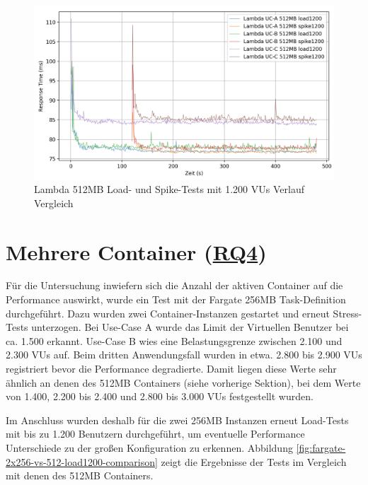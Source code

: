 \begin{figure}[H]
    \includegraphics[width=\textwidth]{img/lambda512-load1200-vs-spike1200-graph.png}
    \caption[Lambda 512MB Load- und Spike-Tests mit 1.200 VUs Verlauf Vergleich]{Lambda 512MB Load- und Spike-Tests mit 1.200 VUs Verlauf Vergleich}
    \label{fig:lambda512-load1200-vs-spike1200-graph}
\end{figure}

\section{Mehrere Container (\hyperref[tab:research-questions]{RQ4})}
Für die Untersuchung inwiefern sich die Anzahl der aktiven Container auf die Performance auswirkt, wurde ein Test mit der Fargate 256MB Task-Definition durchgeführt. Dazu wurden zwei Container-Instanzen gestartet und erneut Stress-Tests unterzogen. Bei Use-Case A wurde das Limit der Virtuellen Benutzer bei ca. 1.500 erkannt. Use-Case B wies eine Belastungsgrenze zwischen 2.100 und 2.300 \acp{VU} auf. Beim dritten Anwendungsfall wurden in etwa. 2.800 bis 2.900 \acp{VU} registriert bevor die Performance degradierte. 
Damit liegen diese Werte sehr ähnlich an denen des 512MB Containers (siehe vorherige Sektion), bei dem Werte von 1.400, 2.200 bis 2.400 und 2.800 bis 3.000 \acp{VU} festgestellt wurden.

Im Anschluss wurden deshalb für die zwei 256MB Instanzen erneut Load-Tests mit bis zu 1.200 Benutzern durchgeführt, um eventuelle Performance Unterschiede zu der großen Konfiguration zu erkennen. Abbildung \ref{fig:fargate-2x256-vs-512-load1200-comparison} zeigt die Ergebnisse der Tests im Vergleich mit denen des 512MB Containers.

